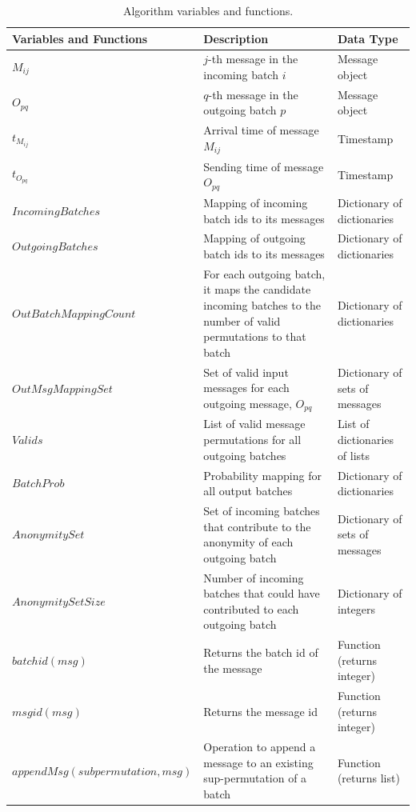 \documentclass{article}
\begin{document}
\begin{table}[!htbp]
\centering\footnotesize 
\begin{tabular}{l p{5.5cm} p{5.5cm}}
\hline
\textbf{Variables and Functions} & \textbf{Description} & \textbf{Data Type} \\
\hline
$M_{ij}$      & $j$-th message in the incoming batch $i$ & Message object\\
$O_{pq}$      & $q$-th message in the outgoing batch $p$ & Message object\\
$t_{M_{ij}}$  & Arrival time of message $M_{ij}$ & Timestamp  \\
$t_{O_{pq}}$  & Sending time of message $O_{pq}$ & Timestamp  \\
$IncomingBatches$ & Mapping of incoming batch ids to its messages & Dictionary of dictionaries \\
$OutgoingBatches$ & Mapping of outgoing batch ids to its messages & Dictionary of dictionaries \\
$OutBatchMappingCount$ & For each outgoing batch, it maps the candidate incoming batches to the number of valid permutations to that batch & Dictionary of dictionaries \\
$OutMsgMappingSet$ & Set of valid input messages for each outgoing message, $O_{pq}$ & Dictionary of sets of messages \\
$Valids$      & List of valid message permutations for all outgoing batches & List of dictionaries of lists  \\
$BatchProb$ & Probability mapping for all output batches & Dictionary of dictionaries \\
$AnonymitySet$ & Set of incoming batches that contribute to the anonymity of each outgoing batch & Dictionary of sets of messages \\
$AnonymitySetSize$ & Number of incoming batches that could have contributed to each outgoing batch & Dictionary of integers \\
$batchid(msg)$ & Returns the batch id of the message  & Function (returns integer) \\
$msgid(msg)$   & Returns the message id  & Function (returns integer) \\
$appendMsg(subpermutation, msg)$  & Operation to append a message to an existing sup-permutation of a batch  & Function (returns list) \\
\hline
\end{tabular}
\caption{Algorithm variables and functions.} %
\label{tab:variables}
\end{table}
\end{document}
